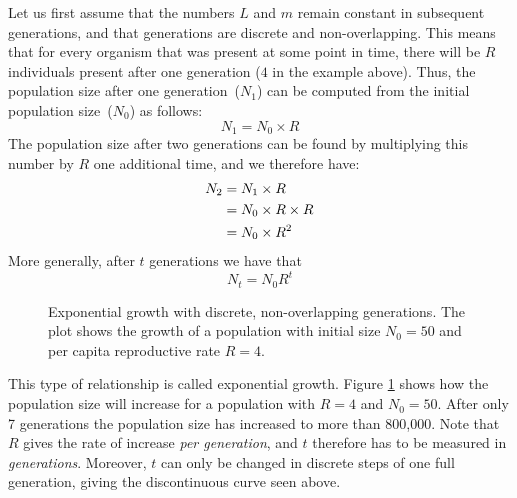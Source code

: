 \documentclass[11pt,a4paper]{book}
\begin{document}
Let us first assume that the numbers $L$ and $m$ remain constant in subsequent generations, and that generations are discrete and non-overlapping. This means that for every organism that was present at some point in time, there will be $R$ individuals present after one generation ($4$ in the example above). Thus, the population size after one generation~($N_1$) can be computed from the initial population size~($N_0$) as follows:
%
\begin{equation*}
\label{}
N_1=N_0\times R
\end{equation*}
%
The population size after two generations can be found by multiplying this number by $R$ one additional time, and we therefore have:
%
\begin{align*}
\notag N_2 &=N_1\times R\\
\notag	&=N_0 \times R\times R\\
	&= N_0\times R^2
\end{align*}
%
More generally, after $t$ generations we have that
%
\begin{equation}
\label{EQexpgrowth}
N_t=N_0 R^t
\end{equation}
%
\begin{figure}[!t]
\begin{center}
\caption{\small Exponential growth with discrete, non-overlapping generations. The plot shows the growth of a population with initial size $N_0=50$ and per capita reproductive rate $R=4$.}
\label{FIGexpgrowth}
\end{center}
\end{figure}
%
This type of relationship is called exponential growth. Figure \ref{FIGexpgrowth} shows how the population size will increase for a population with $R=4$ and $N_0=50$. After only 7 generations the population size has increased to more than 800,000. Note that $R$ gives the rate of increase \emph{per generation}, and $t$ therefore has to be measured in \emph{generations}. Moreover, $t$ can only be changed in discrete steps of one full generation, giving the discontinuous curve seen above.
\end{document}
